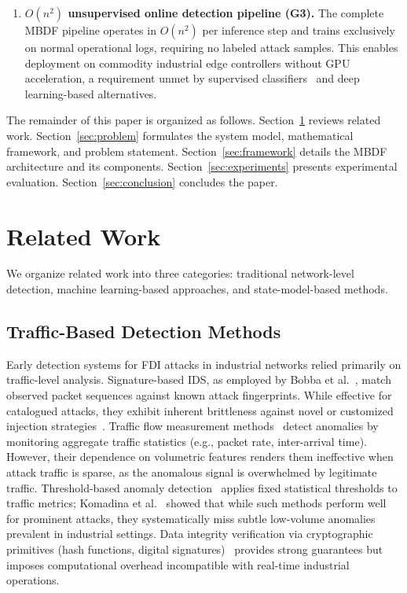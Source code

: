 \documentclass[manuscript,screen,review]{acmart}
\begin{document}
\begin{enumerate}
\item \textbf{$O(n^2)$ unsupervised online detection pipeline
(G3).}
The complete MBDF pipeline operates in $O(n^2)$ per
inference step and trains exclusively on normal operational
logs, requiring no labeled attack samples. This enables
deployment on commodity industrial edge controllers without
GPU acceleration, a requirement unmet by supervised
classifiers~\cite{ref9,ref10,ref11} and deep learning-based
alternatives.

\end{enumerate}

The remainder of this paper is organized as follows.
Section~\ref{sec:related} reviews related work.
Section~\ref{sec:problem} formulates the system model,
mathematical framework, and problem statement.
Section~\ref{sec:framework} details the MBDF architecture
and its components.
Section~\ref{sec:experiments} presents experimental evaluation.
Section~\ref{sec:conclusion} concludes the paper.

\section{Related Work}
\label{sec:related}

We organize related work into three categories: traditional
network-level detection, machine learning-based approaches,
and state-model-based methods.

\subsection{Traffic-Based Detection Methods}

Early detection systems for FDI attacks in industrial networks
relied primarily on traffic-level analysis. Signature-based IDS,
as employed by Bobba et al.~\cite{ref3}, match observed packet
sequences against known attack fingerprints. While effective for
catalogued attacks, they exhibit inherent brittleness against
novel or customized injection strategies~\cite{ref4}. Traffic
flow measurement methods~\cite{ref6,ref24,ref25} detect anomalies
by monitoring aggregate traffic statistics (e.g., packet rate,
inter-arrival time). However, their dependence on volumetric
features renders them ineffective when attack traffic is sparse,
as the anomalous signal is overwhelmed by legitimate traffic.
Threshold-based anomaly detection~\cite{ref8} applies fixed
statistical thresholds to traffic metrics; Komadina et
al.~\cite{ref8} showed that while such methods perform well
for prominent attacks, they systematically miss subtle
low-volume anomalies prevalent in industrial settings.
Data integrity verification via cryptographic primitives
(hash functions, digital signatures)~\cite{ref7} provides
strong guarantees but imposes computational overhead
incompatible with real-time industrial operations.
\end{document}
